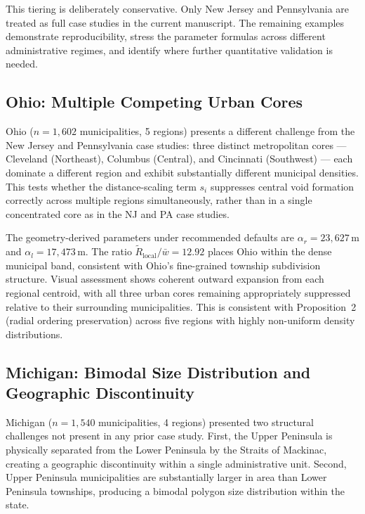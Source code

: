 \documentclass[12pt, a4paper]{article}
\numberwithin{equation}{section}
\begin{document}
This tiering is deliberately conservative. Only New Jersey and Pennsylvania are treated as full case studies in the current manuscript. The remaining examples demonstrate reproducibility, stress the parameter formulas across different administrative regimes, and identify where further quantitative validation is needed.

\subsection{Ohio: Multiple Competing Urban Cores}

Ohio ($n = 1{,}602$ municipalities, 5 regions) presents a different challenge from the New Jersey and Pennsylvania case studies: three distinct metropolitan cores --- Cleveland (Northeast), Columbus (Central), and Cincinnati (Southwest) --- each dominate a different region and exhibit substantially different municipal densities. This tests whether the distance-scaling term $s_i$ suppresses central void formation correctly across multiple regions simultaneously, rather than in a single concentrated core as in the NJ and PA case studies.

The geometry-derived parameters under recommended defaults are $\alpha_r = 23{,}627$\,m and $\alpha_l = 17{,}473$\,m. The ratio $\widetilde{R}_{\text{local}}/\bar{w} = 12.92$ places Ohio within the dense municipal band, consistent with Ohio's fine-grained township subdivision structure. Visual assessment shows coherent outward expansion from each regional centroid, with all three urban cores remaining appropriately suppressed relative to their surrounding municipalities. This is consistent with Proposition~2 (radial ordering preservation) across five regions with highly non-uniform density distributions.

\subsection{Michigan: Bimodal Size Distribution and Geographic Discontinuity}

Michigan ($n = 1{,}540$ municipalities, 4 regions) presented two structural challenges not present in any prior case study. First, the Upper Peninsula is physically separated from the Lower Peninsula by the Straits of Mackinac, creating a geographic discontinuity within a single administrative unit. Second, Upper Peninsula municipalities are substantially larger in area than Lower Peninsula townships, producing a bimodal polygon size distribution within the state.
\end{document}
